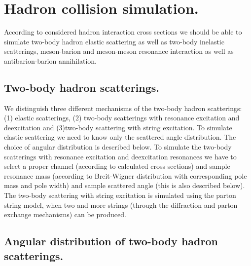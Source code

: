 \section{Hadron collision simulation.}
\hspace{1.0em}According to considered hadron interaction 
cross sections we should be 
able to simulate two-body hadron elastic scattering as well as two-body 
inelastic scatterings, meson-barion and meson-meson resonance interaction as 
well as antibarion-barion annihilation.

\subsection{Two-body hadron scatterings.}

\hspace{1.0em}
We distinguish three different mechanisms of the two-body hadron scatterings:
(1) elastic scatterings, (2) two-body scatterings with resonance excitation and  
deexcitation and (3)two-body scattering with string excitation.
To simulate elastic scattering we need to know only the scattered angle 
distribution. The choice of angular distribution is described below.
To simulate the two-body scatterings with resonance excitation and  
deexcitation resonances we have to select a proper channel (according 
to calculated cross sections) and sample resonance mass (according to 
Breit-Wigner distribution with corresponding pole mass and pole width) and 
sample scattered angle (this is also described below).  
The two-body scattering with string excitation
 is simulated using the parton string model, when  
two and more strings (through the diffraction and parton exchange 
mechanisms) can be produced.

\subsection{Angular distribution of two-body hadron scatterings.}

